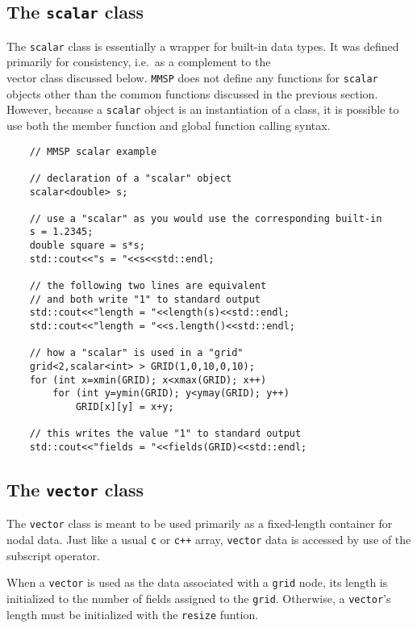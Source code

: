 \subsection{The {\tt scalar} class}
The {\tt scalar} class is essentially a wrapper for built-in data types.  It was defined primarily for consistency, i.e.\ as a complement to the {\\ vector} class discussed below.  {\tt MMSP} does not define any functions for {\tt scalar} objects other than the common functions discussed in the previous section.  However, because a {\tt scalar} object is an instantiation of a class, it is possible to use both the member function and global function calling syntax.
\begin{shadebox}
\begin{verbatim}
    // MMSP scalar example

    // declaration of a "scalar" object
    scalar<double> s;

    // use a "scalar" as you would use the corresponding built-in
    s = 1.2345;
    double square = s*s;
    std::cout<<"s = "<<s<<std::endl;

    // the following two lines are equivalent
    // and both write "1" to standard output
    std::cout<<"length = "<<length(s)<<std::endl;
    std::cout<<"length = "<<s.length()<<std::endl;

    // how a "scalar" is used in a "grid"
    grid<2,scalar<int> > GRID(1,0,10,0,10);
    for (int x=xmin(GRID); x<xmax(GRID); x++)
        for (int y=ymin(GRID); y<ymay(GRID); y++)
            GRID[x][y] = x+y;

    // this writes the value "1" to standard output
    std::cout<<"fields = "<<fields(GRID)<<std::endl;
\end{verbatim}
\end{shadebox}
\subsection{The {\tt vector} class}
The {\tt vector} class is meant to be used primarily as a fixed-length container for nodal data.  Just like a usual {\tt c} or {\tt c++} array, {\tt vector} data is accessed by use of the subscript operator.

When a {\tt vector} is used as the data associated with a {\tt grid} node, its length is initialized to the number of fields assigned to the {\tt grid}.  Otherwise, a {\tt vector}'s length must be initialized with the {\tt resize} funtion.

